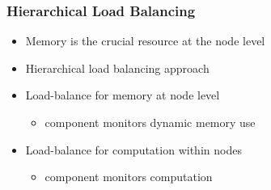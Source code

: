 \begin{frame}[fragile] \frametitle{Hierarchical Load Balancing}
\begin{itemize}
\item Memory is the crucial resource at the node level
\item Hierarchical load balancing approach
\item Load-balance for memory at node level
\begin{itemize}
\item {} component monitors dynamic memory use
\end{itemize}
\item Load-balance for computation within nodes
\begin{itemize}
\item {} component monitors computation
\end{itemize}
\end{itemize}
\end{frame}
